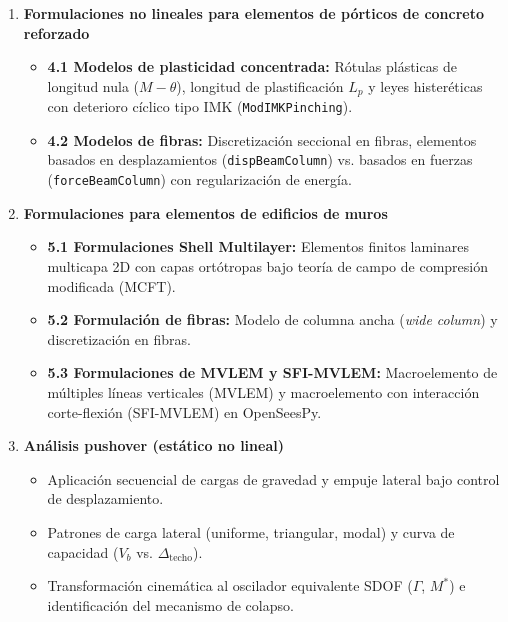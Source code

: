 \documentclass[11pt,letterpaper]{article}
\begin{document}
\begin{enumerate}[leftmargin=18pt, topsep=2pt, itemsep=3.5pt, parsep=0pt, label=\textbf{\arabic*.}]
    \item \textbf{Formulaciones no lineales para elementos de pórticos de concreto reforzado}
    \begin{itemize}[leftmargin=12pt, topsep=1pt, itemsep=1pt]
        \item \textbf{4.1 Modelos de plasticidad concentrada:} Rótulas plásticas de longitud nula ($M-\theta$), longitud de plastificación $L_p$ y leyes histeréticas con deterioro cíclico tipo IMK (\texttt{ModIMKPinching}).
        \item \textbf{4.2 Modelos de fibras:} Discretización seccional en fibras, elementos basados en desplazamientos (\texttt{dispBeamColumn}) vs. basados en fuerzas (\texttt{forceBeamColumn}) con regularización de energía.
    \end{itemize}

    \item \textbf{Formulaciones para elementos de edificios de muros}
    \begin{itemize}[leftmargin=12pt, topsep=1pt, itemsep=1pt]
        \item \textbf{5.1 Formulaciones Shell Multilayer:} Elementos finitos laminares multicapa 2D con capas ortótropas bajo teoría de campo de compresión modificada (MCFT).
        \item \textbf{5.2 Formulación de fibras:} Modelo de columna ancha (\textit{wide column}) y discretización en fibras.
        \item \textbf{5.3 Formulaciones de MVLEM y SFI-MVLEM:} Macroelemento de múltiples líneas verticales (MVLEM) y macroelemento con interacción corte-flexión (SFI-MVLEM) en OpenSeesPy.
    \end{itemize}

    \item \textbf{Análisis pushover (estático no lineal)}
    \begin{itemize}[leftmargin=12pt, topsep=1pt, itemsep=1pt]
        \item Aplicación secuencial de cargas de gravedad y empuje lateral bajo control de desplazamiento.
        \item Patrones de carga lateral (uniforme, triangular, modal) y curva de capacidad ($V_b$ vs. $\Delta_{\text{techo}}$).
        \item Transformación cinemática al oscilador equivalente SDOF ($\Gamma$, $M^*$) e identificación del mecanismo de colapso.
    \end{itemize}


\end{enumerate}
\end{document}

